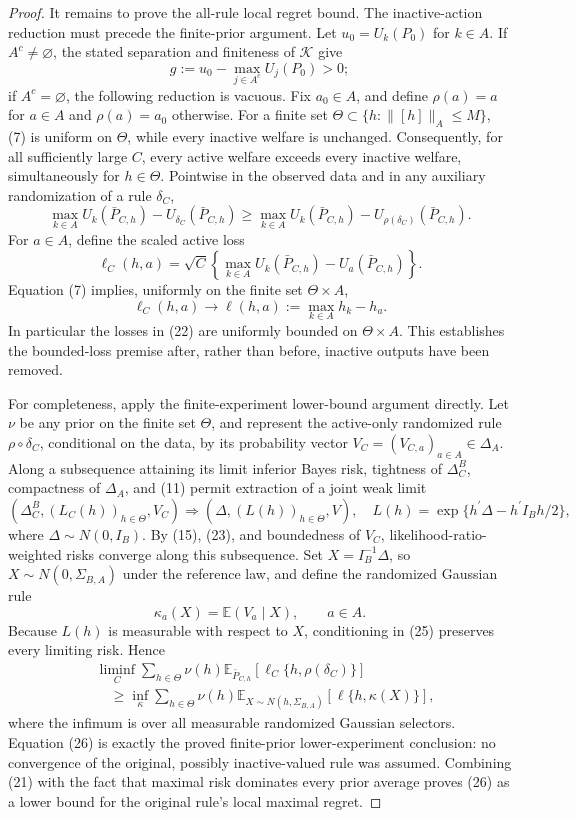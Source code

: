 \documentclass{article}
\begin{document}
\begin{proof}
It remains to prove the all-rule local regret bound.  The inactive-action reduction must precede the finite-prior argument.  Let \(u_0=U_k(P_0)\) for \(k\in A\).  If \(A^c\neq\varnothing\), the stated separation and finiteness of \(\mathcal K\) give
\[
g:=u_0-\max_{j\in A^c}U_j(P_0)>0;
\tag{20}
\]
if \(A^c=\varnothing\), the following reduction is vacuous.  Fix \(a_0\in A\), and define \(\rho(a)=a\) for \(a\in A\) and \(\rho(a)=a_0\) otherwise.  For a finite set \(\Theta\subset\{h:\lVert[h]\rVert_A\leq M\}\), (7) is uniform on \(\Theta\), while every inactive welfare is unchanged.  Consequently, for all sufficiently large \(C\), every active welfare exceeds every inactive welfare, simultaneously for \(h\in\Theta\).  Pointwise in the observed data and in any auxiliary randomization of a rule \(\delta_C\),
\[
\max_{k\in A}U_k(\bar P_{C,h})-U_{\delta_C}(\bar P_{C,h})
\geq
\max_{k\in A}U_k(\bar P_{C,h})-U_{\rho(\delta_C)}(\bar P_{C,h}).
\tag{21}
\]
For \(a\in A\), define the scaled active loss
\[
\ell_C(h,a)=\sqrt C\left\{\max_{k\in A}U_k(\bar P_{C,h})-U_a(\bar P_{C,h})\right\}.
\tag{22}
\]
Equation (7) implies, uniformly on the finite set \(\Theta\times A\),
\[
\ell_C(h,a)\longrightarrow
\ell(h,a):=\max_{k\in A}h_k-h_a.
\tag{23}
\]
In particular the losses in (22) are uniformly bounded on \(\Theta\times A\).  This establishes the bounded-loss premise after, rather than before, inactive outputs have been removed.

For completeness, apply the finite-experiment lower-bound argument directly.  Let \(\nu\) be any prior on the finite set \(\Theta\), and represent the active-only randomized rule \(\rho\circ\delta_C\), conditional on the data, by its probability vector \(V_C=(V_{C,a})_{a\in A}\in\Delta_A\).  Along a subsequence attaining its limit inferior Bayes risk, tightness of \(\Delta_C^B\), compactness of \(\Delta_A\), and (11) permit extraction of a joint weak limit
\[
\left(\Delta_C^B,(L_C(h))_{h\in\Theta},V_C\right)
\Rightarrow
\left(\Delta,(L(h))_{h\in\Theta},V\right),
\quad
L(h)=\exp\{h^{\prime}\Delta-h^{\prime}I_Bh/2\},
\tag{24}
\]
where \(\Delta\sim N(0,I_B)\).  By (15), (23), and boundedness of \(V_C\), likelihood-ratio-weighted risks converge along this subsequence.  Set \(X=I_B^{-1}\Delta\), so \(X\sim N(0,\Sigma_{B,A})\) under the reference law, and define the randomized Gaussian rule
\[
\kappa_a(X)=\mathbb E(V_a\mid X),\qquad a\in A.
\tag{25}
\]
Because \(L(h)\) is measurable with respect to \(X\), conditioning in (25) preserves every limiting risk.  Hence
\[
\begin{split}
&\liminf_C\sum_{h\in\Theta}\nu(h)
\mathbb E_{\bar P_{C,h}}\!\left[\ell_C\{h,\rho(\delta_C)\}\right]\\
&\quad\geq
\inf_{\kappa}\sum_{h\in\Theta}\nu(h)
\mathbb E_{X\sim N(h,\Sigma_{B,A})}[\ell\{h,\kappa(X)\}],
\end{split}
\tag{26}
\]
where the infimum is over all measurable randomized Gaussian selectors.  Equation (26) is exactly the proved finite-prior lower-experiment conclusion: no convergence of the original, possibly inactive-valued rule was assumed.  Combining (21) with the fact that maximal risk dominates every prior average proves (26) as a lower bound for the original rule's local maximal regret.


\end{proof}
\end{document}
